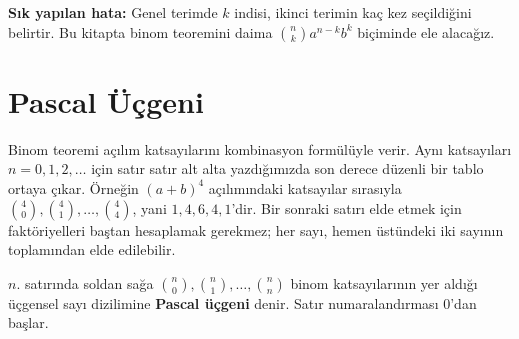 \textbf{Sık yapılan hata:} Genel terimde $k$ indisi, ikinci terimin kaç kez seçildiğini belirtir. Bu kitapta binom teoremini daima $\binom{n}{k}a^{n-k}b^k$ biçiminde ele alacağız.

\section{Pascal Üçgeni}

Binom teoremi açılım katsayılarını kombinasyon formülüyle verir. Aynı katsayıları $n=0,1,2,\dots$ için satır satır alt alta yazdığımızda son derece düzenli bir tablo ortaya çıkar. Örneğin $(a+b)^4$ açılımındaki katsayılar sırasıyla $\binom40,\binom41,\dots,\binom44$, yani $1,4,6,4,1$'dir. Bir sonraki satırı elde etmek için faktöriyelleri baştan hesaplamak gerekmez; her sayı, hemen üstündeki iki sayının toplamından elde edilebilir.

\begin{definition}
$n$. satırında soldan sağa $\binom{n}{0},\binom{n}{1},\ldots,\binom{n}{n}$ binom katsayılarının yer aldığı üçgensel sayı dizilimine \textbf{Pascal üçgeni} denir. Satır numaralandırması $0$'dan başlar.
\end{definition}

